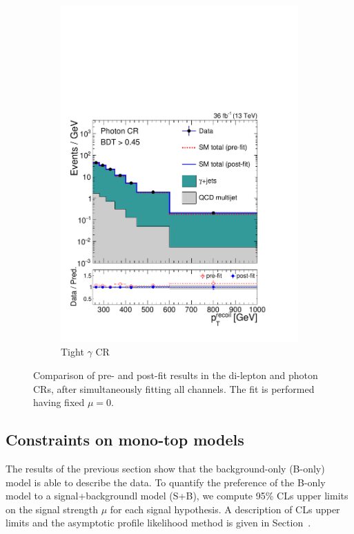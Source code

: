 \begin{figure}[]
\begin{center}
\begin{subfigure}[t]{0.24\textwidth}
            \includegraphics[width=\textwidth]{figures/monotop/postfit/stackedPostfit_photon_monotop.pdf}
            \caption{Tight $\gamma$ CR}
        \end{subfigure}
        \caption{Comparison of pre- and post-fit results in the di-lepton and photon CRs, after simultaneously fitting all channels.
        The fit is performed having fixed $\mu=0$.}
        \label{fig:mt:postfit_zgamma}
    \end{center}
\end{figure}


\subsection{Constraints on mono-top models}

The results of the previous section show that the background-only (B-only) model is able to describe the data.
To quantify the preference of the B-only model to a signal+backgroundl model (S+B), we compute 95\% CLs upper limits on the signal strength $\mu$ for each signal hypothesis.
A description of CLs upper limits and the asymptotic profile likelihood method is given in Section~\cite{sec:cls}.

